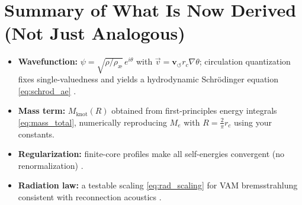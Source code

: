 \documentclass[a4paper,12pt]{article}
\begin{document}
    \section{Summary of What Is Now Derived (Not Just Analogous)}
    \begin{itemize}
        \item \textbf{Wavefunction:} $\psi=\sqrt{\rho/\rho_\text{\ae}}\,e^{i\theta}$ with $\vec v=\mathbf{v}_{\scriptscriptstyle\boldsymbol{\circlearrowleft}} r_c \nabla\theta$; circulation quantization fixes single-valuedness and yields a hydrodynamic Schrödinger equation \eqref{eq:schrod_ae} \cite{Madelung1927,Onsager1949,Feynman1955}.
        \item \textbf{Mass term:} $M_\text{knot}(R)$ obtained from first-principles energy integrals \eqref{eq:mass_total}, numerically reproducing $M_e$ with $R=\frac{2}{\pi}r_c$ using your constants.
        \item \textbf{Regularization:} finite-core profiles make all self-energies convergent (no renormalization) \cite{Saffman1992,Batchelor1967}.
        \item \textbf{Radiation law:} a testable scaling \eqref{eq:rad_scaling} for VAM bremsstrahlung consistent with reconnection acoustics \cite{Leadbeater2001,Zuccher2012,Barenghi2014}.
    \end{itemize}
\end{document}
